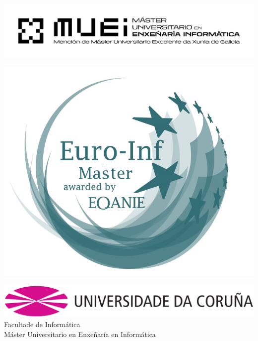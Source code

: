 \begin{titlepage}
\vspace*{-35pt}
\begin{minipage}{.15\linewidth}
    \begin{flushleft}
    \hspace*{-15pt}
      \includegraphics[scale=0.15]{06_imagenes/MUEI.png}
    \end{flushleft}
  \end{minipage}
  \hfill
  \begin{minipage}{.15\linewidth}
    \begin{flushright}
     \includegraphics[scale=0.10]{06_imagenes/euro_inf_master_verde.png}
    \end{flushright} 
  \end{minipage}
 
 \vspace*{30pt}
 
\includegraphics[scale=0.30]{06_imagenes/udc}\\[10pt]
  \hspace*{18pt}\textcolor{udcpink}{{\selectfont Facultade de Informática}}\\[5pt]
  \hspace*{18pt}\textcolor{udcgray}{{\selectfont Máster Universitario en Enxeñaría en Informática}}\\[5pt]
  

\end{titlepage}
